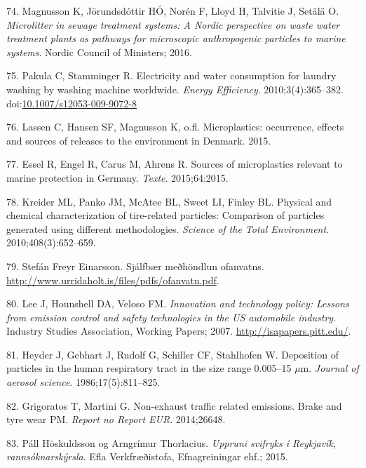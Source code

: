 \documentclass[icelandic,]{book}
\begin{document}
\leavevmode\hypertarget{ref-magnusson2016microlitter}{}%
74. Magnusson K, Jörundsdóttir HÓ, Norén F, Lloyd H, Talvitie J, Setälä O. \emph{Microlitter in sewage treatment systems: A Nordic perspective on waste water treatment plants as pathways for microscopic anthropogenic particles to marine systems}. Nordic Council of Ministers; 2016.

\leavevmode\hypertarget{ref-Pakula2010}{}%
75. Pakula C, Stamminger R. Electricity and water consumption for laundry washing by washing machine worldwide. \emph{Energy Efficiency}. 2010;3(4):365--382. doi:\href{https://doi.org/10.1007/s12053-009-9072-8}{10.1007/s12053-009-9072-8}

\leavevmode\hypertarget{ref-lassen2015microplastics}{}%
76. Lassen C, Hansen SF, Magnusson K, o.fl. Microplastics: occurrence, effects and sources of releases to the environment in Denmark. 2015.

\leavevmode\hypertarget{ref-essel2015sources}{}%
77. Essel R, Engel R, Carus M, Ahrens R. Sources of microplastics relevant to marine protection in Germany. \emph{Texte}. 2015;64:2015.

\leavevmode\hypertarget{ref-kreider2010physical}{}%
78. Kreider ML, Panko JM, McAtee BL, Sweet LI, Finley BL. Physical and chemical characterization of tire-related particles: Comparison of particles generated using different methodologies. \emph{Science of the Total Environment}. 2010;408(3):652--659.

\leavevmode\hypertarget{ref-StefanFreyr}{}%
79. Stefán Freyr Einarsson. Sjálfbær meðhöndlun ofanvatns. \url{http://www.urridaholt.is/files/pdfs/ofanvatn.pdf}.

\leavevmode\hypertarget{ref-lee2007innovation}{}%
80. Lee J, Hounshell DA, Veloso FM. \emph{Innovation and technology policy: Lessons from emission control and safety technologies in the US automobile industry}. Industry Studies Association, Working Papers; 2007. \url{http://isapapers.pitt.edu/}.

\leavevmode\hypertarget{ref-heyder1986deposition}{}%
81. Heyder J, Gebhart J, Rudolf G, Schiller CF, Stahlhofen W. Deposition of particles in the human respiratory tract in the size range 0.005--15 \(\mu\)m. \emph{Journal of aerosol science}. 1986;17(5):811--825.

\leavevmode\hypertarget{ref-grigoratos2014non}{}%
82. Grigoratos T, Martini G. Non-exhaust traffic related emissions. Brake and tyre wear PM. \emph{Report no Report EUR}. 2014;26648.

\leavevmode\hypertarget{ref-Efla2015}{}%
83. Páll Höskuldsson og Arngrímur Thorlacius. \emph{Uppruni svifryks í Reykjavík, rannsóknarskýrsla}. Efla Verkfræðistofa, Efnagreiningar ehf.; 2015.
\end{document}

